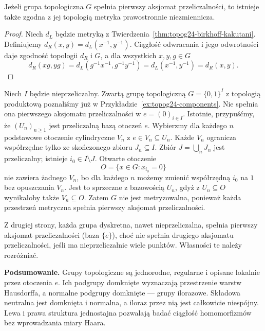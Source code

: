 \begin{wniosek}
\label{cor:topog24-right-metric}
Jeżeli grupa topologiczna \(G\) spełnia
pierwszy aksjomat przeliczalności,
to istnieje także zgodna z jej topologią
metryka prawostronnie niezmiennicza.
\end{wniosek}
\begin{proof}
Niech \(d_L\) będzie metryką
z Twierdzenia~\ref{thm:topog24-birkhoff-kakutani}.
Definiujemy
\(d_R(x,y)=d_L(x^{-1},y^{-1})\).
Ciągłość odwracania i jego odwrotności
daje zgodność topologii \(d_R\) i \(G\),
a dla wszystkich \(x,y,g\in G\)
\[
 d_R(xg,yg)=
 d_L(g^{-1}x^{-1},g^{-1}y^{-1})
 =d_L(x^{-1},y^{-1})
 =d_R(x,y).
\]
\end{proof}

\begin{przyklad}
\label{ex:topog24-uncountable-cube}
Niech \(I\) będzie nieprzeliczalny.
Zwartą grupę topologiczną
\(G=\{0,1\}^I\) z topologią produktową
poznaliśmy już w
Przykładzie~\ref{ex:topog24-components}.
Nie spełnia ona pierwszego aksjomatu
przeliczalności w \(e=(0)_{i\in I}\).
Istotnie, przypuśćmy, że
\((U_n)_{n\ge1}\) jest przeliczalną
bazą otoczeń \(e\).
Wybierzmy dla każdego \(n\)
podstawowe otoczenie cylindryczne
\(V_n\) z \(e\in V_n\subseteq U_n\).
Każde \(V_n\) ogranicza współrzędne
tylko ze skończonego zbioru \(J_n\subseteq I\).
Zbiór \(J=\bigcup_nJ_n\) jest przeliczalny;
istnieje \(i_0\in I\setminus J\).
Otwarte otoczenie
\[
 O=\{x\in G:x_{i_0}=0\}
\]
nie zawiera żadnego \(V_n\),
bo dla każdego \(n\) możemy
zmienić współrzędną \(i_0\)
na \(1\) bez opuszczania \(V_n\).
Jest to sprzeczne z bazowością \(U_n\),
gdyż z \(U_n\subseteq O\)
wynikałoby także \(V_n\subseteq O\).
Zatem \(G\) nie jest metryzowalna,
ponieważ każda przestrzeń metryczna
spełnia pierwszy aksjomat przeliczalności.

Z drugiej strony, każda grupa dyskretna,
nawet nieprzeliczalna, spełnia pierwszy
aksjomat przeliczalności (baza \(\{e\}\)),
choć nie spełnia drugiego aksjomatu
przeliczalności, jeśli ma nieprzeliczalnie
wiele punktów.
Własności te należy rozróżniać.
\end{przyklad}

\par\smallskip\noindent
\textbf{Podsumowanie.}
Grupy topologiczne są jednorodne, regularne
i opisane lokalnie przez otoczenia \(e\).
Ich podgrupy domknięte wyznaczają
przestrzenie warstw Hausdorffa, a normalne
podgrupy domknięte --- grupy ilorazowe.
Składowa neutralna jest domknięta i normalna,
a iloraz przez nią jest całkowicie niespójny.
Lewa i prawa struktura jednostajna
pozwalają badać ciągłość homomorfizmów
bez wprowadzania miary Haara.
